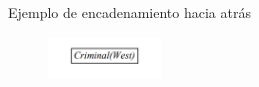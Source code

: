 \begin{frame}{Ejemplo de encadenamiento hacia atrás}

    \begin{figure}[t]
    \centering
    \includegraphics[width=3cm]{32_image_criminal.PNG}
    \end{figure}
   
\end{frame}